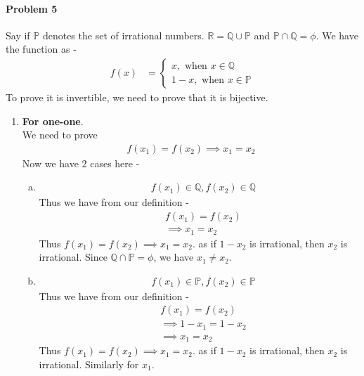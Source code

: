 \documentclass[12pt]{scrartcl}
\begin{document}
\paragraph*{Problem 5}
Say if $\mathbb{P}$ denotes the set of irrational numbers. $\mathbb{R} = \mathbb{Q} \cup \mathbb{P}$ and $\mathbb{P} \cap \mathbb{Q} = \phi$. We have the function as -
\begin{align*}
    f(x) &= \begin{cases}
    x , \text{ when }x \in \mathbb{Q} \\
    1 - x,  \text{ when } x \in \mathbb{P}
    \end{cases}
\end{align*}
To prove it is invertible, we need to prove that it is bijective. 
\begin{enumerate}
    \item \textbf{For one-one}.
    \\ We need to prove
    \begin{align*}
        f(x_1) = f(x_2) \implies x_1 = x_2
    \end{align*}
    Now we have 2 cases here - 
    \begin{enumerate}[a.]
        \item 
        \begin{align*}
            & f(x_1)  \in \mathbb{Q}, f(x_2) \in \mathbb{Q}
        \end{align*}
        Thus we have from our definition -
        \begin{align*}            
             & f(x_1) = f(x_2)
            \\ &\implies x_1 = x_2
        \end{align*}
        Thus $f(x_1) = f(x_2) \implies x_1 = x_2$.
        as if $1 - x_2$ is irrational, then $x_2$ is irrational. Since $\mathbb{Q} \cap \mathbb{P} = \phi$, we have $x_1 \neq x_2$.
        \item 
        \begin{align*}
            & f(x_1)  \in \mathbb{P}, f(x_2) \in \mathbb{P}
        \end{align*}
        Thus we have from our definition -
        \begin{align*}            
             & f(x_1) = f(x_2)
             \\ &\implies 1 - x_1 = 1 - x_2
            \\ &\implies x_1 = x_2
        \end{align*}
        Thus $f(x_1) = f(x_2) \implies x_1 = x_2$.
        as if $1 - x_2$ is irrational, then $x_2$ is irrational. Similarly for $x_1$.

\end{enumerate}
\end{enumerate}
\end{document}
